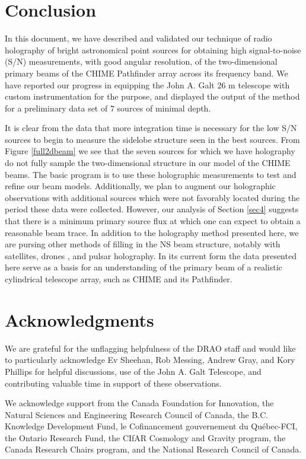 \section{Conclusion} \label{conclusion}

In this document, we have described and validated our technique of radio holography of bright astronomical point sources for obtaining high signal-to-noise (S/N) measurements, with good angular resolution, of the two-dimensional primary beams of the CHIME Pathfinder array across its frequency band. We have reported our progress in equipping the John A. Galt 26 m telescope with custom instrumentation for the purpose, and displayed the output of the method for a preliminary data set of 7 sources of minimal depth. 

It is clear from the data that more integration time is necessary for the low S/N sources to begin to measure the sidelobe structure seen in the best sources. From Figure \ref{full2dbeam} we see that the seven sources for which we have holography do not fully sample the two-dimensional structure in our model of the CHIME beams. The basic program is to use these holographic measurements to test and refine our beam models. Additionally, we plan to augment our holographic observations with additional sources which were not favorably located during the period these data were collected. However, our analysis of Section \ref{sec4} suggests that there is a minimum primary source flux at which one can expect to obtain a reasonable beam trace. In addition to the holography method presented here, we are pursing other methods of filling in the NS beam structure, notably with satellites\citep{hol2, sat2}, drones \citep{drone}, and pulsar holography. In its current form the data presented here serve as a basis for an understanding of the primary beam of a realistic cylindrical telescope array, such as CHIME and its Pathfinder.

\section{Acknowledgments}

We are grateful for the unflagging helpfulness of the DRAO staff and would like to particularly acknowledge Ev Sheehan, Rob Messing, Andrew Gray, and Kory Phillips for helpful discussions, use of the John A. Galt Telescope, and contributing valuable time in support of these observations.

We acknowledge support from the Canada Foundation for Innovation, the Natural Sciences and Engineering Research Council of Canada, the B.C. Knowledge Development Fund, le Cofinancement gouvernement du Qu\'ebec-FCI, the Ontario Research Fund, the CIfAR Cosmology and Gravity program, the Canada Research Chairs program, and the National Research Council of Canada.

